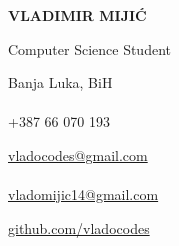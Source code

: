 \documentclass[9pt]{developercv} %
\begin{document}

\begin{minipage}[t]{0.45\textwidth}
	\vspace{-\baselineskip}
	
	{\Huge\textbf{\MakeUppercase{Vladimir Mijić}}}
	
	\vspace{6pt}
	
	{\huge Computer Science Student}
\end{minipage}

\vspace{1cm}

\begin{minipage}[t]{0.3\textwidth}
    \vspace{-\baselineskip}
    
	{\faMapMarker \space}{Banja Luka, BiH}\\\\
	{\faPhone \space}{+387 66 070 193}\\
\end{minipage}
\hfill
\begin{minipage}[t]{0.3\textwidth}
	\vspace{-\baselineskip}
	
	{\faEnvelopeO \space}{\href{mailto:vladocodes@gmail.com}{vladocodes@gmail.com}}\\\\
	{\faEnvelopeO \space}{\href{mailto:vladomijic14@gmail.com}{vladomijic14@gmail.com}}\\
\end{minipage}
\hfill
\begin{minipage}[t]{0.3\textwidth}
	\vspace{-\baselineskip}
	
    {\faGithub \space}{\href{https://github.com/vladocodes}{github.com/vladocodes}}\\
\end{minipage}

\vspace{.5cm}



\end{document}
